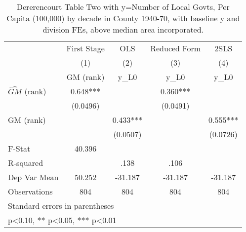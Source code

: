 \begin{table}[htbp]\centering
\def\sym#1{\ifmmode^{#1}\else\(^{#1}\)\fi}
\caption{Dererencourt Table Two with y=Number of Local Govts, Per Capita (100,000) by decade in County 1940-70, with baseline y and division FEs, above median area incorporated.}
\begin{tabular}{l*{4}{c}}
\toprule
                    & First Stage   &         OLS   &Reduced Form   &        2SLS   \\
                    &\multicolumn{1}{c}{(1)}&\multicolumn{1}{c}{(2)}&\multicolumn{1}{c}{(3)}&\multicolumn{1}{c}{(4)}\\
                    &\multicolumn{1}{c}{GM  (rank)}&\multicolumn{1}{c}{y\_L0}&\multicolumn{1}{c}{y\_L0}&\multicolumn{1}{c}{y\_L0}\\
\midrule
$\hat{GM}$ (rank)   &       0.648***&               &       0.360***&               \\
                    &    (0.0496)   &               &    (0.0491)   &               \\
\addlinespace
GM  (rank)          &               &       0.433***&               &       0.555***\\
                    &               &    (0.0507)   &               &    (0.0726)   \\
\midrule
F-Stat              &      40.396   &               &               &               \\
R-squared           &               &        .138   &        .106   &               \\
Dep Var Mean        &      50.252   &     -31.187   &     -31.187   &     -31.187   \\
Observations        &         804   &         804   &         804   &         804   \\
\bottomrule
\multicolumn{5}{l}{\footnotesize Standard errors in parentheses}\\
\multicolumn{5}{l}{\footnotesize * p<0.10, ** p<0.05, *** p<0.01}\\
\end{tabular}
\end{table}
